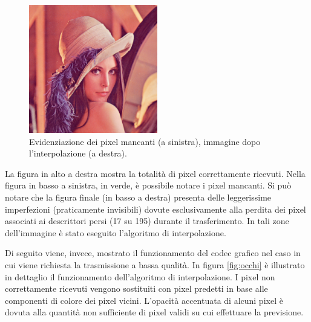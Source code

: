 \begin{figure}[ht]
\includegraphics[width=0.50\textwidth]{../images/lena4.png}
	\caption{Evidenziazione dei pixel mancanti (a sinistra), immagine dopo
	l'interpolazione (a destra).}
\end{figure}

La figura in alto a destra mostra la totalità di pixel correttamente
ricevuti. Nella figura in basso a sinistra, in verde, è possibile notare i pixel
mancanti. Si può notare che la figura finale (in basso a destra) presenta delle
leggerissime imperfezioni (praticamente invisibili) dovute esclusivamente alla
perdita dei pixel associati ai descrittori persi (17 su 195) durante il trasferimento. In tali zone dell'immagine è stato eseguito l'algoritmo di interpolazione.

Di seguito viene, invece, mostrato il funzionamento del codec grafico
nel caso in cui viene richiesta la trasmissione a bassa qualità. In figura
\ref{fig:occhi} è illustrato in dettaglio il funzionamento dell'algoritmo di interpolazione. I pixel non correttamente
ricevuti vengono sostituiti con pixel predetti in base alle componenti di
colore dei pixel vicini. L'opacità accentuata di alcuni pixel è dovuta alla
quantità non sufficiente di pixel validi su cui effettuare la previsione.

